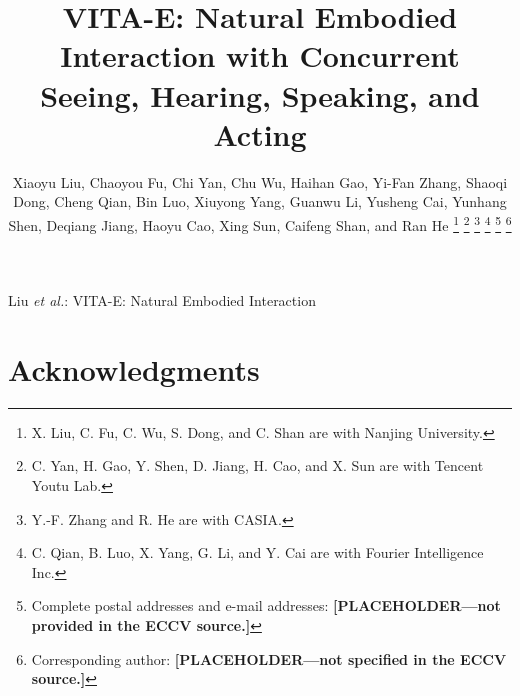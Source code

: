 \documentclass[letterpaper,journal]{IEEEtran}
\begin{document}
\title{VITA-E: Natural Embodied Interaction with Concurrent Seeing, Hearing, Speaking, and Acting}

\author{Xiaoyu Liu, Chaoyou Fu, Chi Yan, Chu Wu, Haihan Gao, Yi-Fan Zhang,
Shaoqi Dong, Cheng Qian, Bin Luo, Xiuyong Yang, Guanwu Li, Yusheng Cai,
Yunhang Shen, Deqiang Jiang, Haoyu Cao, Xing Sun, Caifeng Shan, and Ran He%
\thanks{X. Liu, C. Fu, C. Wu, S. Dong, and C. Shan are with Nanjing University.}%
\thanks{C. Yan, H. Gao, Y. Shen, D. Jiang, H. Cao, and X. Sun are with Tencent Youtu Lab.}%
\thanks{Y.-F. Zhang and R. He are with CASIA.}%
\thanks{C. Qian, B. Luo, X. Yang, G. Li, and Y. Cai are with Fourier Intelligence Inc.}%
\thanks{Complete postal addresses and e-mail addresses: \textbf{[PLACEHOLDER---not provided in the ECCV source.]}}%
\thanks{Corresponding author: \textbf{[PLACEHOLDER---not specified in the ECCV source.]}}%
}

%
{Liu \MakeLowercase{\textit{et al.}}: VITA-E: Natural Embodied Interaction}


\maketitle



\begin{IEEEkeywords}
\end{IEEEkeywords}







\section*{Acknowledgments}





\end{document}
